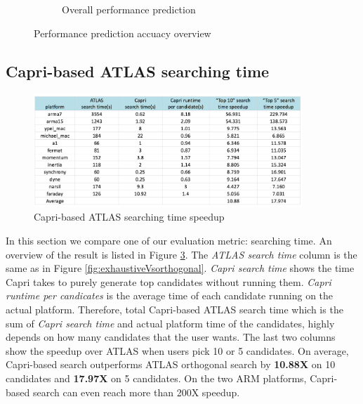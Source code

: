 \begin{figure}[bhp]
\begin{subfigure}[b]{1.0\linewidth}
      \caption{Overall performance prediction}
      \label{fig:overall_perf}
    \end{subfigure}
    \caption{Performance prediction accuacy overview}
  \end{figure}



  \subsection{Capri-based ATLAS searching time}
  \label{sec:capri_atlas_searching}
  \begin{figure}[tbhp]
    \centering
    \includegraphics[width=0.9\textwidth]{images/timespeedup.png}
    \caption{Capri-based ATLAS searching time speedup}
    \label{fig:search_time}
  \end{figure}

  In this section we compare one of our evaluation metric: searching time. An overview of the result is listed in
  Figure \ref{fig:search_time}. The \textit{ATLAS search time} column is the same as in Figure \ref{fig:exhaustiveVsorthogonal}.
  \textit{Capri search time} shows the time Capri takes to purely generate top candidates without running them.
  \textit{Capri runtime per candicates} is the average time of each candidate running on the actual platform.
  Therefore, total Capri-based ATLAS search time which is the sum of \textit{Capri search time} and actual platform time of the candidates,
  highly depends on how many candidates that the user wants. The last two columns show the speedup over ATLAS when users pick
  10 or 5 candidates. On average, Capri-based search outperforms ATLAS orthogonal search by \textbf{10.88X} on 10 candidates and \textbf{17.97X} on
  5 candidates. On the two ARM platforms, Capri-based search can even reach more than 200X speedup.


